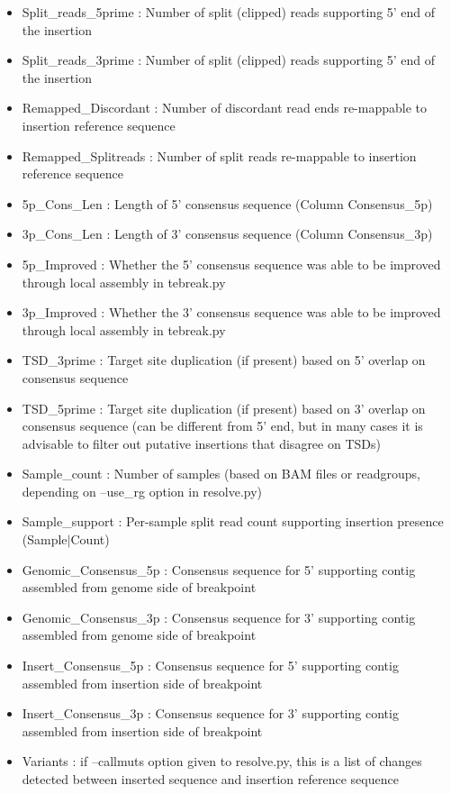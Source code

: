 \documentclass[letterpaper,11pt]{article}
\begin{document}
\begin{itemize}
\item Split\_reads\_5prime : Number of split (clipped) reads supporting 5' end of the insertion
\item Split\_reads\_3prime : Number of split (clipped) reads supporting 5' end of the insertion
\item Remapped\_Discordant : Number of discordant read ends re-mappable to insertion reference sequence
\item Remapped\_Splitreads : Number of split reads re-mappable to insertion reference sequence
\item 5p\_Cons\_Len : Length of 5' consensus sequence (Column Consensus\_5p)
\item 3p\_Cons\_Len : Length of 3' consensus sequence (Column Consensus\_3p)
\item 5p\_Improved : Whether the 5' consensus sequence was able to be improved through local assembly in tebreak.py
\item 3p\_Improved : Whether the 3' consensus sequence was able to be improved through local assembly in tebreak.py
\item TSD\_3prime : Target site duplication (if present) based on 5' overlap on consensus sequence
\item TSD\_5prime : Target site duplication (if present) based on 3' overlap on consensus sequence (can be different from 5' end, but in many cases it is advisable to filter out putative insertions that disagree on TSDs)
\item Sample\_count : Number of samples (based on BAM files or readgroups, depending on --use\_rg option in resolve.py)
\item Sample\_support : Per-sample split read count supporting insertion presence (Sample$\vert$Count)
\item Genomic\_Consensus\_5p : Consensus sequence for 5' supporting contig assembled from genome side of breakpoint
\item Genomic\_Consensus\_3p : Consensus sequence for 3' supporting contig assembled from genome side of breakpoint
\item Insert\_Consensus\_5p : Consensus sequence for 5' supporting contig assembled from insertion side of breakpoint
\item Insert\_Consensus\_3p : Consensus sequence for 3' supporting contig assembled from insertion side of breakpoint
\item Variants : if --callmuts option given to resolve.py, this is a list of changes detected between inserted sequence and insertion reference sequence
\end{itemize}
\end{document}
